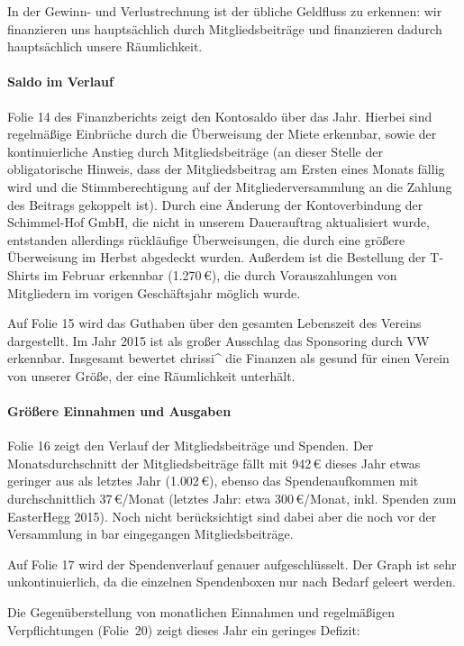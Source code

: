 \documentclass{s0minutes}
\begin{document}
In der Gewinn- und Verlustrechnung ist der übliche Geldfluss zu erkennen: wir
finanzieren uns hauptsächlich durch Mitgliedsbeiträge und finanzieren dadurch
hauptsächlich unsere Räumlichkeit.

\paragraph{Saldo im Verlauf}
Folie 14 des Finanzberichts zeigt den Kontosaldo über das Jahr. Hierbei sind
regelmäßige Einbrüche durch die Überweisung der Miete erkennbar, sowie der
kontinuierliche Anstieg durch Mitgliedsbeiträge (an dieser Stelle der
obligatorische Hinweis, dass der Mitgliedsbeitrag am Ersten eines Monats fällig
wird und die Stimmberechtigung auf der Mitgliederversammlung an die Zahlung des
Beitrags gekoppelt ist). Durch eine Änderung der Kontoverbindung der
Schimmel-Hof GmbH, die nicht in unserem Dauerauftrag aktualisiert wurde,
entstanden allerdings rückläufige Überweisungen, die durch eine größere
Überweisung im Herbst abgedeckt wurden. Außerdem ist die Bestellung der T-Shirts
im Februar erkennbar (1{.}270\,€), die durch Vorauszahlungen von Mitgliedern im
vorigen Geschäftsjahr möglich wurde.

Auf Folie 15 wird das Guthaben über den gesamten Lebenszeit des Vereins
dargestellt. Im Jahr 2015 ist als großer Ausschlag das Sponsoring durch VW
erkennbar. Insgesamt bewertet chrissi\^{} die Finanzen als gesund für einen
Verein von unserer Größe, der eine Räumlichkeit unterhält.

\paragraph{Größere Einnahmen und Ausgaben}
Folie 16 zeigt den Verlauf der Mitgliedsbeiträge und Spenden. Der
Monatsdurchschnitt der Mitgliedsbeiträge fällt mit 942\,€ dieses Jahr etwas
geringer aus als letztes Jahr (1{.}002\,€), ebenso das Spendenaufkommen mit
durchschnittlich 37\,€/Monat (letztes Jahr: etwa 300\,€/Monat, inkl. Spenden zum
EasterHegg 2015). Noch nicht berücksichtigt sind dabei aber die noch vor der
Versammlung in bar eingegangen Mitgliedsbeiträge.

Auf Folie 17 wird der Spendenverlauf genauer aufgeschlüsselt. Der Graph ist sehr
unkontinuierlich, da die einzelnen Spendenboxen nur nach Bedarf geleert werden.

Die Gegenüberstellung von monatlichen Einnahmen und regelmäßigen Verpflichtungen
(Folie~20) zeigt dieses Jahr ein geringes Defizit:
\end{document}
